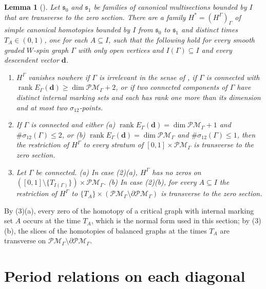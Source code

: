 \documentclass[11pt]{amsart}
\newtheorem{lemma}[theorem]{Lemma}
\theoremstyle{definition}
\theoremstyle{remark}
\begin{document}
\begin{lemma}[{\cite[Lem.~3.40]{GKT}}]
\label{lem:gktextension}
Let $\mathfrak s_0$ and $\mathfrak s_1$ be families of canonical multisections
bounded by $I$ that are transverse to the zero section.  There are a family
$H^*=(H^\Gamma)_\Gamma$ of simple canonical homotopies bounded by $I$ from
$\mathfrak s_0$ to $\mathfrak s_1$ and distinct times $T_A\in(0,1)$, one for
each $A\subseteq I$, such that the following hold for every smooth graded
$W$-spin graph $\Gamma$ with only open vertices and $I(\Gamma)\subseteq I$
and every descendent vector $\mathbf d$.
\begin{enumerate}
\item[(1)] $H^\Gamma$ vanishes nowhere if $\Gamma$ is irrelevant in the sense
of \cite[Def.~1.57]{GKT}, if $\Gamma$ is connected with
$\operatorname{rank}E_\Gamma(\mathbf d)\ge\dim\mathcal{PM}_\Gamma+2$, or if
two connected components of $\Gamma$ have distinct internal marking sets and
each has rank one more than its dimension and at most two
$\sigma_{12}$-points.
\item[(2)] If $\Gamma$ is connected and either (a)
$\operatorname{rank}E_\Gamma(\mathbf d)=\dim\mathcal{PM}_\Gamma+1$ and
$\#\sigma_{12}(\Gamma)\le2$, or (b)
$\operatorname{rank}E_\Gamma(\mathbf d)=\dim\mathcal{PM}_\Gamma$ and
$\#\sigma_{12}(\Gamma)\le1$, then the restriction of $H^\Gamma$ to every stratum of
$[0,1]\times\mathcal{PM}_\Gamma$ is transverse to the zero section.
\item[(3)] Let $\Gamma$ be connected.  (a) In case (2)(a), $H^\Gamma$ has no
zeros on $([0,1]\setminus\{T_{I(\Gamma)}\})\times\mathcal{PM}_\Gamma$.  (b) In
case (2)(b), for every $A\subseteq I$ the restriction of $H^\Gamma$ to
$\{T_A\}\times(\mathcal{PM}_\Gamma\setminus\partial\mathcal{PM}_\Gamma)$ is
transverse to the zero section.
\end{enumerate}
\end{lemma}

By (3)(a), every zero of the homotopy of a critical graph with internal
marking set $A$ occurs at the time $T_A$, which is the normal form used in
this section; by (3)(b), the slices of the homotopies of balanced graphs at
the times $T_A$ are transverse on
$\mathcal{PM}_\Gamma\setminus\partial\mathcal{PM}_\Gamma$.

\section{Period relations on each diagonal}
\label{sec:diagonal}
\end{document}
